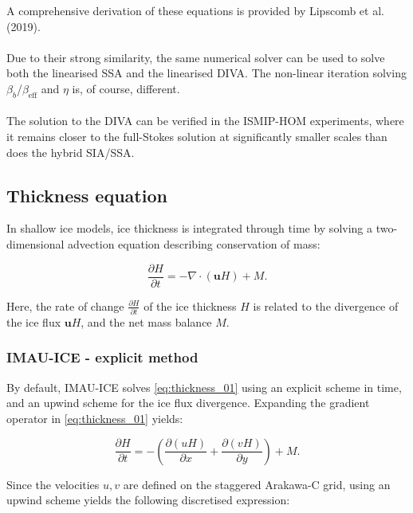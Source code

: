 \documentclass{article}
\begin{document}
A comprehensive derivation of these equations is provided by Lipscomb et al. (2019).\\
\\
Due to their strong similarity, the same numerical solver can be used to solve both the linearised SSA and the linearised DIVA. The non-linear iteration solving $\beta_b$/$\beta_{\textrm{eff}}$ and $\eta$ is, of course, different.\\
\\
The solution to the DIVA can be verified in the ISMIP-HOM experiments, where it remains closer to the full-Stokes solution at significantly smaller scales than does the hybrid SIA/SSA.

\newpage
\subsection{Thickness equation}

In shallow ice models, ice thickness is integrated through time by solving a two-dimensional advection equation describing conservation of mass:

\begin{equation} \label{eq:thickness_01}
\frac{\partial H}{\partial t} = -\nabla \cdot \left( \textbf{u} H \right) + M.
\end{equation}

Here, the rate of change $\frac{\partial H}{\partial t}$ of the ice thickness $H$ is related to the divergence of the ice flux $\textbf{u} H$, and the net mass balance $M$.

\subsubsection{IMAU-ICE - explicit method}

By default, IMAU-ICE solves \eqref{eq:thickness_01} using an explicit scheme in time, and an upwind scheme for the ice flux divergence. Expanding the gradient operator in \eqref{eq:thickness_01} yields:

\begin{equation} \label{eq:thickness_02}
\frac{\partial H}{\partial t} = -\left( \frac{\partial \left( u H\right) }{\partial x} + \frac{\partial \left( v H\right) }{\partial y} \right) + M.
\end{equation}

Since the velocities $u,v$ are defined on the staggered Arakawa-C grid, using an upwind scheme yields the following discretised expression:
\end{document}
